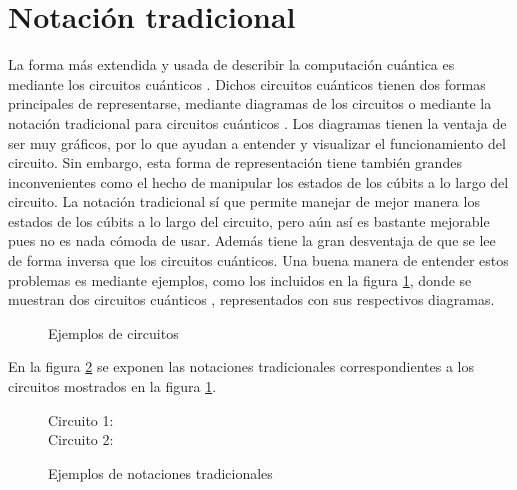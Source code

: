 \documentclass[10pt,conference,a4paper]{IEEEtran}
\begin{document}
\section{Notación tradicional}
\label{seccion:2}
La forma más extendida y usada de describir la computación cuántica es mediante los circuitos cuánticos \cite{Deutsch}. Dichos circuitos cuánticos tienen dos formas principales de representarse, mediante diagramas de los circuitos o mediante la notación tradicional para circuitos cuánticos \cite{Nielsen_Chuang}. Los diagramas tienen la ventaja de ser muy gráficos, por lo que ayudan a entender y visualizar el funcionamiento del circuito. Sin embargo, esta forma de representación tiene también grandes inconvenientes como el hecho de manipular los estados de los cúbits a lo largo del circuito. La notación tradicional sí que permite manejar de mejor manera los estados de los cúbits a lo largo del circuito, pero aún así es bastante mejorable pues no es nada cómoda de usar. Además tiene la gran desventaja de que se lee de forma inversa que los circuitos cuánticos. Una buena manera de entender estos problemas es mediante ejemplos, como los incluidos en la figura \ref{Fig1}, donde se muestran dos circuitos cuánticos%
, representados con sus respectivos diagramas.

\hypertarget{fig:ejemplos}{
\begin{figure}[htb!]
    \centering
        \caption{Ejemplos de circuitos}
        \label{Fig1}
\end{figure}}
\newpage
 En la figura \ref{Fig2} se exponen las notaciones tradicionales correspondientes a los circuitos mostrados en la figura  \ref{Fig1}.
 
 
\begin{figure}[htb!]
\begin{center}
    Circuito 1: \\
    \vspace{1.5mm}
    Circuito 2: \\
    \end{center}
    \caption{Ejemplos de notaciones tradicionales}
        \label{Fig2}
\end{figure}
\end{document}
